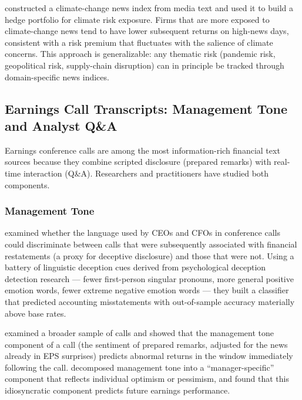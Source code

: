 \citet{engle2020hedging} constructed a climate-change news index from media text and used it to build a hedge portfolio for climate risk exposure. Firms that are more exposed to climate-change news tend to have lower subsequent returns on high-news days, consistent with a risk premium that fluctuates with the salience of climate concerns. This approach is generalizable: any thematic risk (pandemic risk, geopolitical risk, supply-chain disruption) can in principle be tracked through domain-specific news indices.

\subsection{Earnings Call Transcripts: Management Tone and Analyst Q\&A}
\label{sec:ch09-earnings-call-transcripts}

Earnings conference calls are among the most information-rich financial text sources because they combine scripted disclosure (prepared remarks) with real-time interaction (Q\&A). Researchers and practitioners have studied both components.

\subsubsection*{Management Tone}

\citet{larcker2012detecting} examined whether the language used by CEOs and CFOs in conference calls could discriminate between calls that were subsequently associated with financial restatements (a proxy for deceptive disclosure) and those that were not. Using a battery of linguistic deception cues derived from psychological deception detection research --- fewer first-person singular pronouns, more general positive emotion words, fewer extreme negative emotion words --- they built a classifier that predicted accounting misstatements with out-of-sample accuracy materially above base rates.

\citet{price2012earnings} examined a broader sample of calls and showed that the management tone component of a call (the sentiment of prepared remarks, adjusted for the news already in EPS surprises) predicts abnormal returns in the window immediately following the call. \citet{davis2015effect} decomposed management tone into a ``manager-specific'' component that reflects individual optimism or pessimism, and found that this idiosyncratic component predicts future earnings performance.

